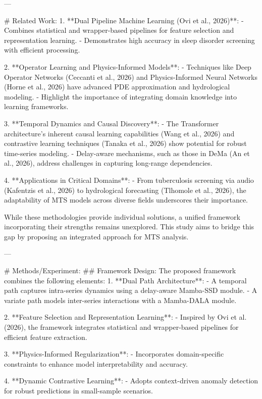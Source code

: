 ---

# Related Work:
1. **Dual Pipeline Machine Learning (Ovi et al., 2026)**:
   - Combines statistical and wrapper-based pipelines for feature selection and representation learning.
   - Demonstrates high accuracy in sleep disorder screening with efficient processing.

2. **Operator Learning and Physics-Informed Models**:
   - Techniques like Deep Operator Networks (Ceccanti et al., 2026) and Physics-Informed Neural Networks (Horne et al., 2026) have advanced PDE approximation and hydrological modeling.
   - Highlight the importance of integrating domain knowledge into learning frameworks.

3. **Temporal Dynamics and Causal Discovery**:
   - The Transformer architecture's inherent causal learning capabilities (Wang et al., 2026) and contrastive learning techniques (Tanaka et al., 2026) show potential for robust time-series modeling.
   - Delay-aware mechanisms, such as those in DeMa (An et al., 2026), address challenges in capturing long-range dependencies.

4. **Applications in Critical Domains**:
   - From tuberculosis screening via audio (Kafentzis et al., 2026) to hydrological forecasting (Tlhomole et al., 2026), the adaptability of MTS models across diverse fields underscores their importance.

While these methodologies provide individual solutions, a unified framework incorporating their strengths remains unexplored. This study aims to bridge this gap by proposing an integrated approach for MTS analysis.

---

# Methods/Experiment:
## Framework Design:
The proposed framework combines the following elements:
1. **Dual Path Architecture**:
   - A temporal path captures intra-series dynamics using a delay-aware Mamba-SSD module.
   - A variate path models inter-series interactions with a Mamba-DALA module.

2. **Feature Selection and Representation Learning**:
   - Inspired by Ovi et al. (2026), the framework integrates statistical and wrapper-based pipelines for efficient feature extraction.

3. **Physics-Informed Regularization**:
   - Incorporates domain-specific constraints to enhance model interpretability and accuracy.

4. **Dynamic Contrastive Learning**:
   - Adopts context-driven anomaly detection for robust predictions in small-sample scenarios.

